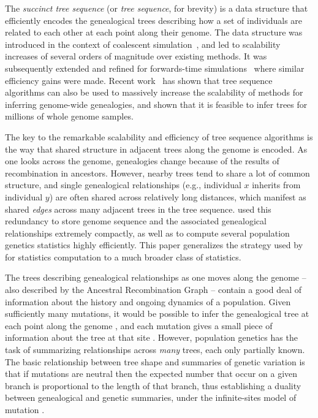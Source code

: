 \documentclass{article}
\begin{document}
The \emph{succinct tree sequence} (or \emph{tree sequence}, for brevity) is a data
structure that efficiently encodes the genealogical trees describing how a set of
individuals are related to each other at each point along their genome. The
data structure was introduced in the context of coalescent
simulation~\citep{kelleher2016efficient}, and led to scalability increases of
several orders of magnitude over existing methods. It was subsequently extended
and refined for forwards-time simulations~\citep{kelleher2018efficient,haller2018tree}
where similar efficiency gains were made. Recent
work~\citep{kelleher2018inferring} has shown that tree sequence algorithms can
also be used to massively increase the scalability of methods for inferring
genome-wide genealogies, and shown that it is feasible to infer trees for
millions of whole genome samples.

The key to the remarkable scalability and efficiency of tree sequence
algorithms is the way that shared structure in adjacent trees along the genome is encoded. 
As one looks across the genome, genealogies change because of the results of recombination in ancestors.
However, nearby trees tend to share a lot of common structure,
and single genealogical relationships (e.g., individual $x$ inherits from individual $y$)
are often shared across relatively long distances,
which manifest as shared \emph{edges} across many adjacent trees in the tree sequence.
\citep{kelleher2016efficient} used this redundancy
to store genome sequence and the associated genealogical relationships extremely compactly,
as well as to compute several population genetics statistics highly efficiently.
This paper generalizes the strategy used by \citep{kelleher2016efficient} for statistics computation
to a much broader class of statistics.

The trees describing genealogical relationships as one moves along the genome
-- also described by the Ancestral Recombination Graph \citep[][or ARG,]{arg} --
contain a good deal of information about the history and ongoing dynamics of a population.
Given sufficiently many mutations, it would be possible to infer the genealogical tree
at each point along the genome \citep{felsenstein_book},
and each mutation gives a small piece of information about the tree at that site
\citep{semple2003phylogenetics}.
However, population genetics has the task of summarizing relationships across \emph{many} trees,
each only partially known.
The basic relationship between tree shape and summaries of genetic variation
is that if mutations are neutral then the expected number that occur on a given branch
is proportional to the length of that branch,
thus establishing a duality between genealogical and genetic summaries,
under the infinite-sites model of mutation \citep{ralph2019empirical}.
\end{document}
